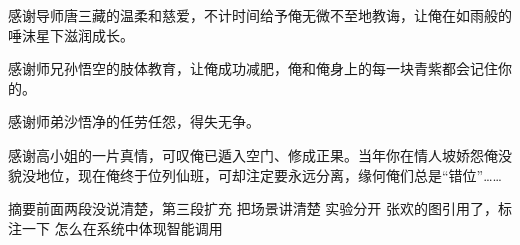 \begin{thanks}
感谢导师唐三藏的温柔和慈爱，不计时间给予俺无微不至地教诲，让俺在如雨般的唾沫星下滋润成长。

感谢师兄孙悟空的肢体教育，让俺成功减肥，俺和俺身上的每一块青紫都会记住你的。

感谢师弟沙悟净的任劳任怨，得失无争。

感谢高小姐的一片真情，可叹俺已遁入空门、修成正果。当年你在情人坡娇怨俺没貌没地位，现在俺终于位列仙班，可却注定要永远分离，缘何俺们总是“错位”……

\begin{flushright}
{}

\end{flushright}

\end{thanks}

摘要前面两段没说清楚，第三段扩充
把场景讲清楚
实验分开
张欢的图引用了，标注一下
怎么在系统中体现智能调用
